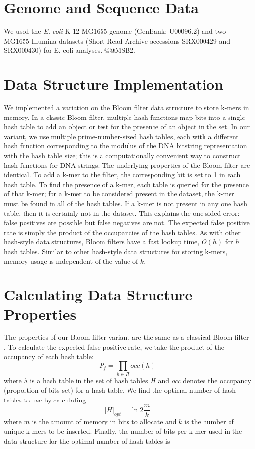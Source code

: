 \documentclass{pnastwo}
\begin{document}
\begin{article}
\begin{materials}

\section{Genome and Sequence Data}
We used the \emph{E. coli} K-12 MG1655 genome (GenBank: U00096.2) and two MG1655 Illumina 
datasets (Short Read Archive accessions SRX000429 and SRX000430) for E. coli
analyses.  @@MSB2.

\section{Data Structure Implementation}
We implemented a variation on the Bloom filter data structure to store
k-mers in memory. In a classic Bloom filter, multiple hash functions
map bits into a single hash table to add an object or test for the presence
of an object in the set. In our variant, we use multiple
prime-number-sized hash tables, each with a different hash
function corresponding to the modulus of the DNA bitstring
representation with the hash table size; this is a computationally convenient way to construct hash functions for DNA strings.  The underlying properties of
the Bloom filter are identical.  To add a k-mer to the
filter, the corresponding bit is set to 1 in each hash table.  To find
the presence of a k-mer, each table is queried for the presence of
that k-mer; for a k-mer to be considered present in the dataset, the
k-mer must be found in all of the hash tables.  If a k-mer is not
present in any one hash table, then it is certainly not in the
dataset. This explains the one-sided error: false positives are
possible but false negatives are not. The expected false positive rate
is simply the product of the occupancies of the hash tables.  As with
other hash-style data structures, Bloom filters have a fast lookup
time, $O(h)$ for $h$ hash tables.  Similar to other hash-style data
structures for storing k-mers, memory usage is independent of the
value of $k$.

\section{Calculating Data Structure Properties}
The properties of our Bloom filter variant are the
same as a classical Bloom filter \cite{bloomsurvey}.
To calculate the expected false positive 
rate, we
take the product of the occupancy of each hash table:
\begin{displaymath}
P_f = \prod_{h \in H} occ(h)
\end{displaymath}
where $h$ is a hash table in the set of hash tables $H$ and $occ$ denotes
the occupancy (proportion of bits set) for a hash table.
We find the optimal number of hash tables
to use by calculating
\begin{displaymath}
\vert H \vert_{opt} = \ln 2 \frac{m}{k}
\end{displaymath}
where $m$ is the amount of memory in bits to allocate and $k$
is the number of unique k-mers to be inserted. Finally,
the number of bits per
k-mer used in the data structure for the optimal number of hash 
tables is


\end{materials}
\end{article}
\end{document}
